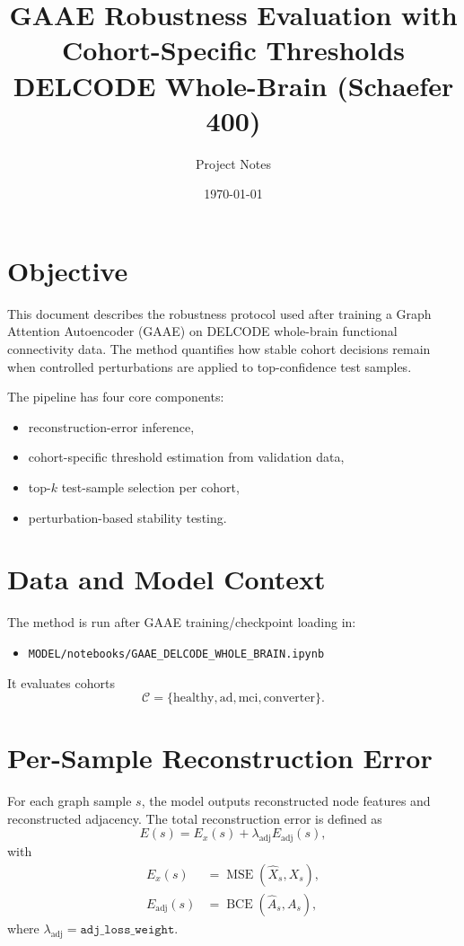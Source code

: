 \documentclass[11pt]{article}
\title{GAAE Robustness Evaluation with Cohort-Specific Thresholds\\DELCODE Whole-Brain (Schaefer 400)}
\author{Project Notes}
\date{\today}
\begin{document}
\maketitle

\section*{Objective}
This document describes the robustness protocol used after training a Graph Attention Autoencoder (GAAE) on DELCODE whole-brain functional connectivity data. The method quantifies how stable cohort decisions remain when controlled perturbations are applied to top-confidence test samples.

The pipeline has four core components:
\begin{itemize}
\item reconstruction-error inference,
\item cohort-specific threshold estimation from validation data,
\item top-$k$ test-sample selection per cohort,
\item perturbation-based stability testing.
\end{itemize}

\section*{Data and Model Context}
The method is run after GAAE training/checkpoint loading in:
\begin{itemize}
\item \texttt{MODEL/notebooks/GAAE\_DELCODE\_WHOLE\_BRAIN.ipynb}
\end{itemize}

It evaluates cohorts
\[
\mathcal{C}=\{\text{healthy},\text{ad},\text{mci},\text{converter}\}.
\]

\section*{Per-Sample Reconstruction Error}
For each graph sample $s$, the model outputs reconstructed node features and reconstructed adjacency. The total reconstruction error is defined as
\begin{equation}
E(s)=E_x(s)+\lambda_{\text{adj}}E_{\text{adj}}(s),
\end{equation}
with
\begin{align}
E_x(s) &= \operatorname{MSE}\!\left(\hat{X}_s, X_s\right), \\
E_{\text{adj}}(s) &= \operatorname{BCE}\!\left(\hat{A}_s, A_s\right),
\end{align}
where $\lambda_{\text{adj}}=\texttt{adj\_loss\_weight}$.
\end{document}

